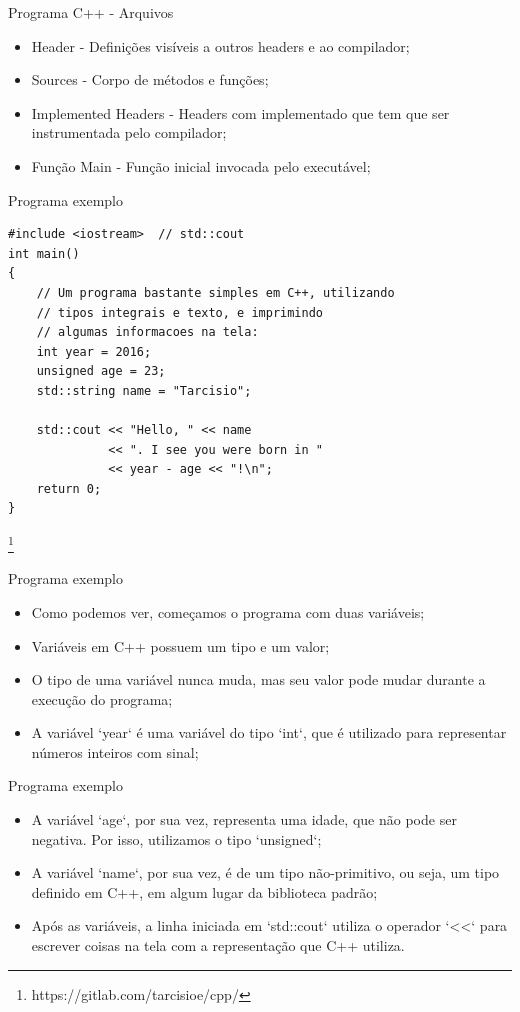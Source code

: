 \documentclass[12pt]{beamer}
\begin{document}
\begin{frame}{Programa C++ - Arquivos}
\begin{itemize}
\item Header - Definições visíveis a outros headers e ao compilador;
\item Sources - Corpo de métodos e funções;
\item Implemented Headers - Headers com implementado que tem que ser instrumentada pelo compilador;
\item Função Main - Função inicial invocada pelo executável;
\end{itemize}
\end{frame}

\begin{frame}[fragile]{Programa exemplo}
\begin{lstlisting}
#include <iostream>  // std::cout
int main()
{
    // Um programa bastante simples em C++, utilizando
    // tipos integrais e texto, e imprimindo 
    // algumas informacoes na tela:
    int year = 2016;
    unsigned age = 23;
    std::string name = "Tarcisio";

    std::cout << "Hello, " << name
              << ". I see you were born in "
              << year - age << "!\n";
    return 0;
}
\end{lstlisting}
\footnote{https://gitlab.com/tarcisioe/cpp/}
\end{frame}

\begin{frame}{Programa exemplo}
\begin{itemize}
\item Como podemos ver, começamos o programa com duas variáveis;
\item Variáveis em C++ possuem um tipo e um valor;
\item O tipo de uma variável nunca muda, mas seu valor pode mudar durante a execução do programa;
\item A variável `year` é uma variável do tipo `int`, que é utilizado para representar números inteiros com sinal;
\end{itemize}
\end{frame}

\begin{frame}{Programa exemplo}
\begin{itemize}
\item A variável `age`, por sua vez, representa uma idade, que não pode ser negativa. Por isso, utilizamos o tipo `unsigned`; 
\item A variável `name`, por sua vez, é de um tipo não-primitivo, ou seja, um tipo definido em C++, em algum lugar da biblioteca padrão;
\item Após as variáveis, a linha iniciada em `std::cout` utiliza o operador `<<` para escrever coisas na tela com a representação que C++ utiliza.
\end{itemize}
\end{frame}
\end{document}
